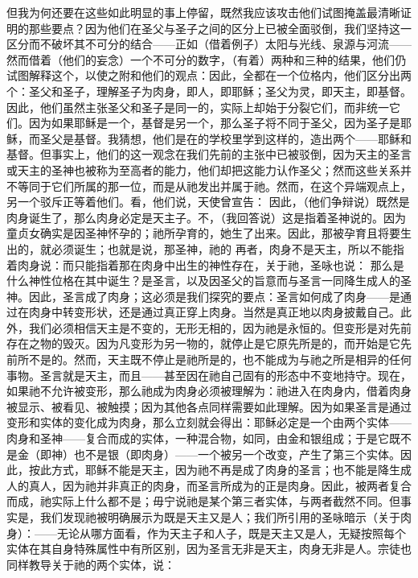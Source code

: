 但我为何还要在这些如此明显的事上停留，既然我应该攻击他们试图掩盖最清晰证明的那些要点？因为他们在圣父与圣子之间的区分上已被全面驳倒，我们坚持这一区分而不破坏其不可分的结合——正如（借着例子）太阳与光线、泉源与河流——然而借着（他们的妄念）一个不可分的数字，（有着）两种和三种的结果，他们仍试图解释这个，以使之附和他们的观点：因此，全都在一个位格内，他们区分出两个：圣父和圣子，理解圣子为肉身，即人，即耶稣；圣父为灵，即天主，即基督。因此，他们虽然主张圣父和圣子是同一的，实际上却始于分裂它们，而非统一它们。因为如果耶稣是一个，基督是另一个，那么圣子将不同于圣父，因为圣子是耶稣，而圣父是基督。我猜想，他们是在的学校里学到这样的，造出两个——耶稣和基督。但事实上，他们的这一观念在我们先前的主张中已被驳倒，因为天主的圣言或天主的圣神也被称为至高者的能力，他们却把这能力认作圣父；然而这些关系并不等同于它们所属的那一位，而是从祂发出并属于祂。然而，在这个异端观点上，另一个驳斥正等着他们。看，他们说，天使曾宣告： 因此，（他们争辩说）既然是肉身诞生了，那么肉身必定是天主子。不，（我回答说）这是指着圣神说的。因为童贞女确实是因圣神怀孕的；祂所孕育的，她生了出来。因此，那被孕育且将要生出的，就必须诞生；也就是说，那圣神，祂的 再者，肉身不是天主，所以不能指着肉身说：而只能指着那在肉身中出生的神性存在，关于祂，圣咏也说： 那么是什么神性位格在其中诞生？是圣言，以及因圣父的旨意而与圣言一同降生成人的圣神。因此，圣言成了肉身；这必须是我们探究的要点：圣言如何成了肉身——是通过在肉身中转变形状，还是通过真正穿上肉身。当然是真正地以肉身披戴自己。此外，我们必须相信天主是不变的，无形无相的，因为祂是永恒的。但变形是对先前存在之物的毁灭。因为凡变形为另一物的，就停止是它原先所是的，而开始是它先前所不是的。然而，天主既不停止是祂所是的，也不能成为与祂之所是相异的任何事物。圣言就是天主，而且——甚至因在祂自己固有的形态中不变地持守。现在，如果祂不允许被变形，那么祂成为肉身必须被理解为：祂进入在肉身内，借着肉身被显示、被看见、被触摸；因为其他各点同样需要如此理解。因为如果圣言是通过变形和实体的变化成为肉身，那么立刻就会得出：耶稣必定是一个由两个实体——肉身和圣神——复合而成的实体，一种混合物，如同，由金和银组成；于是它既不是金（即神）也不是银（即肉身）——一个被另一个改变，产生了第三个实体。因此，按此方式，耶稣不能是天主，因为祂不再是成了肉身的圣言；也不能是降生成人的真人，因为祂并非真正的肉身，而圣言所成为的正是肉身。因此，被两者复合而成，祂实际上什么都不是；毋宁说祂是某个第三者实体，与两者截然不同。但事实是，我们发现祂被明确展示为既是天主又是人；我们所引用的圣咏暗示（关于肉身）：——无论从哪方面看，作为天主子和人子，既是天主又是人，无疑按照每个实体在其自身特殊属性中有所区别，因为圣言无非是天主，肉身无非是人。宗徒也同样教导关于祂的两个实体，说： 